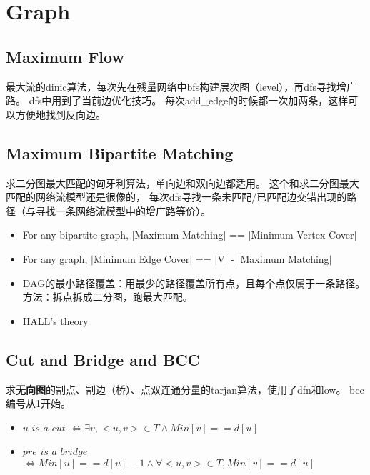 \documentclass[twoside, UTF8]{article}
\begin{document}
	\section{Graph}
		\subsection{Maximum Flow}
			\begin{flushleft}
				最大流的dinic算法，每次先在残量网络中bfs构建层次图（level），再dfs寻找增广路。
				\linebreak dfs中用到了当前边优化技巧。
				\linebreak 每次add\_edge的时候都一次加两条，这样可以方便地找到反向边。
			\end{flushleft}
			
			
		\newpage
		\subsection{Maximum Bipartite Matching}
			\begin{flushleft}
				求二分图最大匹配的匈牙利算法，单向边和双向边都适用。
				\linebreak 这个和求二分图最大匹配的网络流模型还是很像的，
				\linebreak 每次dfs寻找一条未匹配/已匹配边交错出现的路径（与寻找一条网络流模型中的增广路等价）。
			\end{flushleft}
			\begin{itemize}
				\item For any bipartite graph, $|$Maximum Matching$|$ == $|$Minimum Vertex Cover$|$
				\item For any graph, $|$Minimum Edge Cover$|$ == $|$V$|$ - $|$Maximum Matching$|$
				\item DAG的最小路径覆盖：用最少的路径覆盖所有点，且每个点仅属于一条路径。方法：拆点拆成二分图，跑最大匹配。
				\item HALL's theory
			\end{itemize}
			
		\newpage
		\subsection{Cut and Bridge and BCC}
			\begin{flushleft}
				求\textbf{无向图}的割点、割边（桥）、点双连通分量的tarjan算法，使用了dfn和low。
				\linebreak bcc编号从1开始。
			\end{flushleft}
			
			\begin{itemize}
				\item $u$ $is$ $a$ $cut$ $\Leftrightarrow \exists v, <u, v> \in T \wedge Min[v] == d[u]$
				\item $pre$ $is$ $a$ $bridge$ $\Leftrightarrow Min[u] == d[u] - 1 \wedge \forall <u, v> \in T, Min[v] == d[u]$
			\end{itemize}
		\newpage
\end{document}
